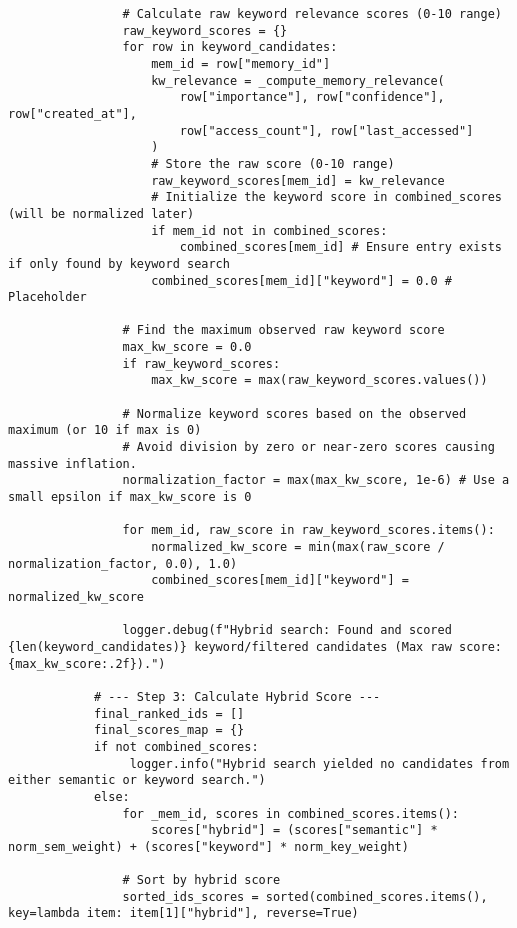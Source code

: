 \documentclass[12pt,a4paper]{article}
\begin{document}
\begin{pageablecode}
\begin{verbatim}
                # Calculate raw keyword relevance scores (0-10 range)
                raw_keyword_scores = {}
                for row in keyword_candidates:
                    mem_id = row["memory_id"]
                    kw_relevance = _compute_memory_relevance(
                        row["importance"], row["confidence"], row["created_at"],
                        row["access_count"], row["last_accessed"]
                    )
                    # Store the raw score (0-10 range)
                    raw_keyword_scores[mem_id] = kw_relevance
                    # Initialize the keyword score in combined_scores (will be normalized later)
                    if mem_id not in combined_scores:
                        combined_scores[mem_id] # Ensure entry exists if only found by keyword search
                    combined_scores[mem_id]["keyword"] = 0.0 # Placeholder

                # Find the maximum observed raw keyword score
                max_kw_score = 0.0
                if raw_keyword_scores:
                    max_kw_score = max(raw_keyword_scores.values())

                # Normalize keyword scores based on the observed maximum (or 10 if max is 0)
                # Avoid division by zero or near-zero scores causing massive inflation.
                normalization_factor = max(max_kw_score, 1e-6) # Use a small epsilon if max_kw_score is 0

                for mem_id, raw_score in raw_keyword_scores.items():
                    normalized_kw_score = min(max(raw_score / normalization_factor, 0.0), 1.0)
                    combined_scores[mem_id]["keyword"] = normalized_kw_score

                logger.debug(f"Hybrid search: Found and scored {len(keyword_candidates)} keyword/filtered candidates (Max raw score: {max_kw_score:.2f}).")

            # --- Step 3: Calculate Hybrid Score ---
            final_ranked_ids = []
            final_scores_map = {}
            if not combined_scores:
                 logger.info("Hybrid search yielded no candidates from either semantic or keyword search.")
            else:
                for _mem_id, scores in combined_scores.items():
                    scores["hybrid"] = (scores["semantic"] * norm_sem_weight) + (scores["keyword"] * norm_key_weight)

                # Sort by hybrid score
                sorted_ids_scores = sorted(combined_scores.items(), key=lambda item: item[1]["hybrid"], reverse=True)


\end{verbatim}
\end{pageablecode}
\end{document}
